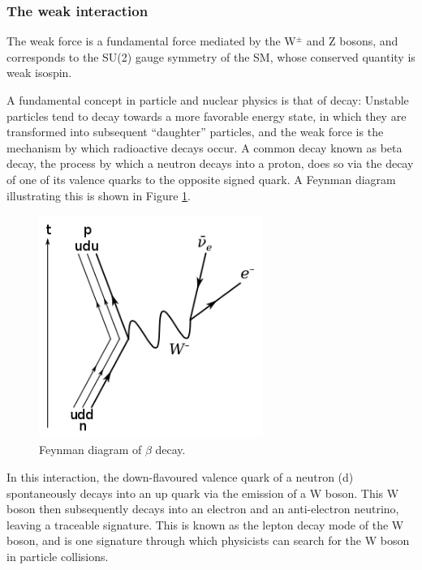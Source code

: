 \subsubsection{The weak interaction}

The weak force is a fundamental force mediated by the W$^{\pm}$ and Z bosons, and corresponds to the SU(2) gauge symmetry of the SM, whose conserved quantity is weak isospin. 

A fundamental concept in particle and nuclear physics is that of decay: Unstable particles tend to decay towards a more favorable energy state, in which they are transformed into subsequent ``daughter'' particles, and the weak force is the mechanism by which radioactive decays occur. A common decay known as beta decay, the process by which a neutron decays into a proton, does so via the decay of one of its valence quarks to the opposite signed quark. A Feynman diagram illustrating this is shown in Figure \ref{fig:BetaDecay_FD}. 

\begin{figure}[H]
    \centering
    \includegraphics[width=0.65\textwidth]{Images/Theory/Beta_Decay_FD.png}
    \caption{Feynman diagram of $\beta$ decay.}
    \label{fig:BetaDecay_FD}
\end{figure}

In this interaction, the down-flavoured valence quark of a neutron (d) spontaneously decays into an up quark via the emission of a W boson. This W boson then subsequently decays into an electron and an anti-electron neutrino, leaving a traceable signature. This is known as the lepton decay mode of the W boson, and is one signature through which physicists can search for the W boson in particle collisions.

